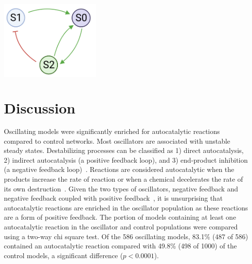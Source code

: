 \documentclass[12pt]{report}
\begin{document}
\begin{center}
    \includegraphics[width=5cm]{images/feedback-cycle.png}
    \label{fig:feedback}
\end{center}


\section{Discussion}

Oscillating models were significantly enriched for autocatalytic reactions compared to control networks. Most oscillators are associated with unstable steady states. Destabilizing processes can be classified as 1) direct autocatalysis, 2) indirect autocatalysis (a positive feedback loop), and 3) end-product inhibition (a negative feedback loop)~\cite{Tyson1975, tyson2007}. Reactions are considered autocatalytic when the products increase the rate of reaction or when a chemical decelerates the rate of its own destruction~\cite{Tyson2004}. Given the two types of oscillators, negative feedback and negative feedback coupled with positive feedback~\cite{Sauro_dynamics}, it is unsurprising that autocatalytic reactions are enriched in the oscillator population as these reactions are a form of positive feedback. The portion of models containing at least one autocatalytic reaction in the oscillator and control populations were compared using a two-way chi square test. Of the 586 oscillating models, 83.1\% (487 of 586) contained an autocatalytic reaction compared with 49.8\% (498 of 1000) of the control models, a significant difference ($p < 0.0001$). 
\end{document}
